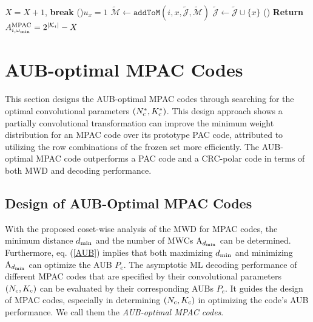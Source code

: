 \documentclass[12pt, draftclsnofoot, peerreview, onecolumn]{IEEEtran}
\theoremstyle{noparent}
\begin{document}
\begin{algorithm}[!thbp]
{{{{{                        $X = X+1$, \textbf{break}
                    }
                }
                {
                    \If(){$u_x=1 $}{
                        $\tilde{\mathcal{M}} \leftarrow \texttt{addToM}(i,x, \tilde{\mathcal{J}}, \tilde{\mathcal{M}})$\;
                        $\tilde{\mathcal{J}} \leftarrow \tilde{\mathcal{J}}\cup\{x\}$\; 
                    }
                }
            }
            \Else(){
            }
        }
    }
    {\bf Return} $A_{i,\omega_{\rm{min}}}^{\rm{MPAC}} = 2^{|\mathcal{K}_i|}-X$\;
\end{algorithm}

\section{AUB-optimal MPAC Codes}
\label{AUBoptimal_MPAC_Codes}
This section designs the AUB-optimal MPAC codes through searching for the optimal convolutional parameters $(N_{\rm c}^*,K_{\rm c}^*)$. 
This design approach shows a partially convolutional transformation can improve the minimum weight distribution for an MPAC code over its prototype PAC code, attributed to utilizing the row combinations of the frozen set more efficiently. 
The AUB-optimal MPAC code outperforms a PAC code and a CRC-polar code in terms of both MWD and decoding performance.


\subsection{Design of AUB-Optimal MPAC Codes}
With the proposed coset-wise analysis of the MWD for MPAC codes, 
the minimum distance $d_{\rm min}$ and the number of MWCs 
${\rm A}_{d_{\min}}$ can be determined.
Furthermore, eq. (\ref{AUB}) implies that both maximizing $d_{\rm min}$
and minimizing ${\rm A}_{d_{\min}}$ can optimize the AUB $P_e$.
The asymptotic ML decoding performance of different MPAC codes that are specified by 
their convolutional parameters $(N_{\rm c},K_{\rm c})$ can be evaluated by their corresponding AUBs $P_e$.
It guides the design of MPAC codes,
especially in determining $(N_{\rm c},K_{\rm c})$ in optimizing the code's AUB performance.
We call them the \textit{AUB-optimal MPAC codes}.
\end{document}
